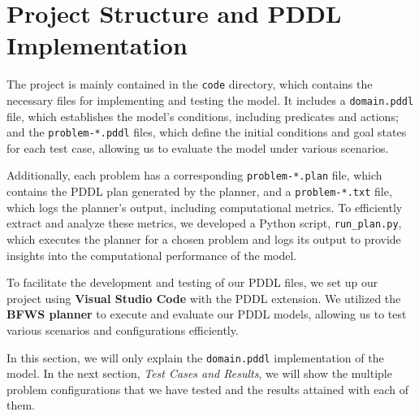 \documentclass{article}
\begin{document}
\section{Project Structure and PDDL Implementation}

The project is mainly contained in the \texttt{code} directory, which contains the necessary files for implementing and testing the model. It includes a \texttt{domain.pddl} file, which establishes the model's conditions, including predicates and actions; and the \texttt{problem-*.pddl} files, which define the initial conditions and goal states for each test case, allowing us to evaluate the model under various scenarios.

Additionally, each problem has a corresponding \texttt{problem-*.plan} file, which contains the PDDL plan generated by the planner, and a \texttt{problem-*.txt} file, which logs the planner's output, including computational metrics. To efficiently extract and analyze these metrics, we developed a Python script, \texttt{run\_plan.py}, which executes the planner for a chosen problem and logs its output to provide insights into the computational performance of the model.

To facilitate the development and testing of our PDDL files, we set up our project using \textbf{Visual Studio Code} with the PDDL extension. We utilized the \textbf{BFWS planner} to execute and evaluate our PDDL models, allowing us to test various scenarios and configurations efficiently.

In this section, we will only explain the \texttt{domain.pddl} implementation of the model. In the next section, \textit{Test Cases and Results}, we will show the multiple problem configurations that we have tested and the results attained with each of them.
\end{document}

